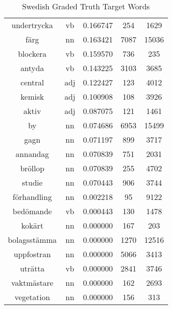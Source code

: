 \begin{table}
\begin{tabular}{ccccc}
undertrycka      & vb            & 0.166747           & 254                & 1629                \\
färg             & nn            & 0.163421           & 7087               & 15036               \\
blockera         & vb            & 0.159570           & 736                & 235                 \\
antyda           & vb            & 0.143225           & 3103               & 3685                \\
central          & adj           & 0.122427           & 123                & 4012                \\
kemisk           & adj           & 0.100908           & 108                & 3926                \\
aktiv            & adj           & 0.087075           & 121                & 1461                \\
by               & nn            & 0.074686           & 6953               & 15499               \\
gagn             & nn            & 0.071197           & 899                & 3717                \\
annandag         & nn            & 0.070839           & 751                & 2031                \\
bröllop          & nn            & 0.070839           & 255                & 4702                \\
studie           & nn            & 0.070443           & 906                & 3744                \\
förhandling      & nn            & 0.002218           & 95                 & 9122                \\
bedömande        & vb            & 0.000443           & 130                & 1478                \\
kokärt           & nn            & 0.000000           & 167                & 203                 \\
bolagsstämma     & nn            & 0.000000           & 1270               & 12516               \\
uppfostran       & nn            & 0.000000           & 5066               & 3413                \\
uträtta          & vb            & 0.000000           & 2841               & 3746                \\
vaktmästare      & nn            & 0.000000           & 162                & 2693                \\
vegetation       & nn            & 0.000000           & 156                & 313                 \\
\bottomrule
\end{tabular}
\caption{Swedish Graded Truth Target Words}
\label{tab:sve-truthtargets}
\end{table}


